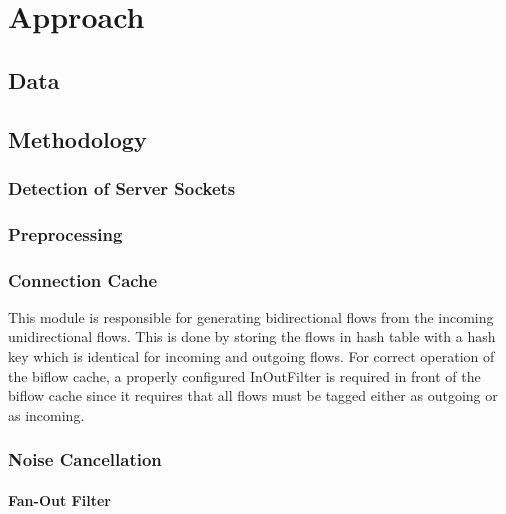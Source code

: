 
\chapter{Approach}


\section{Data}

\section{Methodology}

\subsection{Detection of Server Sockets}



\subsection{Preprocessing}

\subsection{Connection Cache}
This module is responsible for generating bidirectional flows from the incoming unidirectional flows. This is done by storing the flows in hash table with a hash key which is identical for incoming and outgoing flows. For correct operation of the biflow cache, a properly configured InOutFilter is required in front of the biflow cache since it requires that all flows must be tagged either as outgoing or as incoming. 

\subsection{Noise Cancellation}
\subsubsection{Fan-Out Filter}

